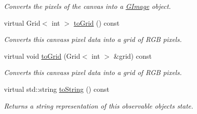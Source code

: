 \begin{DoxyCompactItemize}
\begin{DoxyCompactList}\small\item\em Converts the pixels of the canvas into a \mbox{\hyperlink{classGImage}{G\+Image}} object. \end{DoxyCompactList}\item 
virtual Grid$<$ int $>$ \mbox{\hyperlink{classGCanvas_a2f9b15856aaf66aa95cfd7405bd972cc}{to\+Grid}} () const
\begin{DoxyCompactList}\small\item\em Converts this canvas\textquotesingle{}s pixel data into a grid of R\+GB pixels. \end{DoxyCompactList}\item 
virtual void \mbox{\hyperlink{classGCanvas_a11c06bec679dda1519ed914bca68900a}{to\+Grid}} (Grid$<$ int $>$ \&grid) const
\begin{DoxyCompactList}\small\item\em Converts this canvas\textquotesingle{}s pixel data into a grid of R\+GB pixels. \end{DoxyCompactList}\item 
virtual std\+::string \mbox{\hyperlink{classGObservable_a1fe5121d6528fdea3f243321b3fa3a49}{to\+String}} () const
\begin{DoxyCompactList}\small\item\em Returns a string representation of this observable object\textquotesingle{}s state. \end{DoxyCompactList}\end{DoxyCompactItemize}
